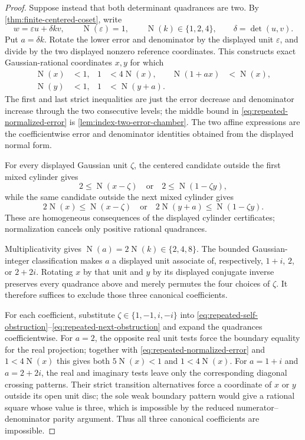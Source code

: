 \documentclass[11pt]{article}
\newcommand{\Norm}[1]{\operatorname{N}\!\left(#1\right)}
\begin{document}
\begin{proof}
Suppose instead that both determinant quadrances are two.  By
\cref{thm:finite-centered-coset}, write
\[
        w=\varepsilon u+\delta k v,
        \qquad \Norm\varepsilon=1,
        \qquad \Norm k\in\{1,2,4\},
        \qquad \delta=\det(u,v).
\]
Put $a=\delta k$.  Rotate the lower error and denominator by the displayed
unit $\varepsilon$, and divide by the two displayed nonzero reference
coordinates.  This constructs exact Gaussian-rational coordinates $x,y$
for which
\begin{align}
 \Norm x&<1,& 1&<4\Norm x,&
 \Norm{1+ax}&<\Norm x,\label{eq:repeated-normalized-error}\\
 \Norm y&<1,& 1&<\Norm{y+a}.\label{eq:repeated-normalized-denominator}
\end{align}
The first and last strict inequalities are just the error decrease and
denominator increase through the two consecutive levels; the middle bound in
\eqref{eq:repeated-normalized-error} is
\cref{lem:index-two-error-chamber}.  The two affine expressions are the
coefficientwise error and denominator identities obtained from the displayed
normal form.

For every displayed Gaussian unit $\zeta$, the centered candidate outside
the first mixed cylinder gives
\begin{equation}
  2\le\Norm{x-\zeta}
  \quad\text{or}\quad
  2\le\Norm{1-\zeta y},
  \label{eq:repeated-self-obstruction}
\end{equation}
while the same candidate outside the next mixed cylinder gives
\begin{equation}
  2\Norm x\le\Norm{x-\zeta}
  \quad\text{or}\quad
  2\Norm{y+a}\le\Norm{1-\zeta y}.
  \label{eq:repeated-next-obstruction}
\end{equation}
These are homogeneous consequences of the displayed cylinder certificates;
normalization cancels only positive rational quadrances.

Multiplicativity gives
$\Norm a=2\Norm k\in\{2,4,8\}$.  The bounded Gaussian-integer
classification makes $a$ a displayed unit associate of, respectively,
$1+i$, $2$, or $2+2i$.  Rotating $x$ by that unit and $y$ by its displayed
conjugate inverse preserves every quadrance above and merely permutes the
four choices of $\zeta$.  It therefore suffices to exclude those three
canonical coefficients.

For each coefficient, substitute $\zeta\in\{1,-1,i,-i\}$ into
\eqref{eq:repeated-self-obstruction}--\eqref{eq:repeated-next-obstruction}
and expand the quadrances coefficientwise.  For $a=2$, the opposite real
unit tests force the boundary equality for the real projection; together
with \eqref{eq:repeated-normalized-error} and $1<4\Norm x$ this gives both
$5\Norm x<1$ and $1<4\Norm x$.  For $a=1+i$ and $a=2+2i$, the real and
imaginary tests leave only the corresponding diagonal crossing patterns.
Their strict transition alternatives force a coordinate of $x$ or $y$
outside its open unit disc; the sole weak boundary pattern would give a
rational square whose value is three, which is impossible by the reduced
numerator--denominator parity argument.  Thus all three canonical
coefficients are impossible.


\end{proof}
\end{document}
